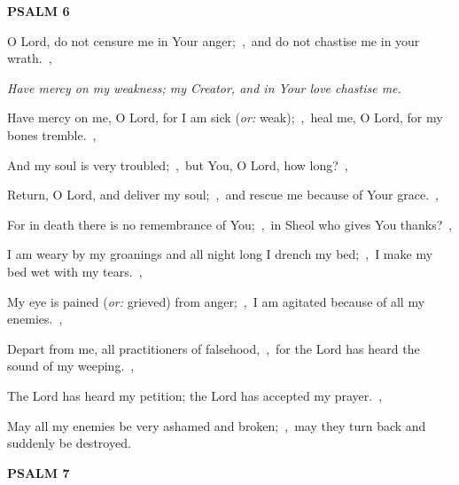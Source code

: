 \documentclass[12pt,twoside,a5paper]{article}
\newcommand{\psalm}[1]{\textbf{PSALM {#1}}\nopagebreak}
\newcommand{\qanona}[1]{{\liturgicalhint{Qanona.} \emph{#1}}}
\newcommand{\translationoption}[1]{\emph{or:} #1}
\begin{document}
\psalm{6}

\begin{normalparskip}
  O Lord, do not censure me in Your anger;~\sep\ and do not chastise me in your wrath.~\sep

  \qanona{Have mercy on my weakness; my Creator, and in Your love chastise me.}

  Have mercy on me, O Lord, for I am sick (\translationoption{weak});~\sep\ heal me, O Lord, for my bones tremble.~\sep

  And my soul is very troubled;~\sep\ but You, O Lord, how long?~\sep

  Return, O Lord, and deliver my soul;~\sep\ and rescue me because of Your grace.~\sep

  For in death there is no remembrance of You;~\sep\ in Sheol who gives You thanks?~\sep

  I am weary by my groanings and all night long I drench my bed;~\sep\ I make my bed wet with my tears.~\sep

  My eye is pained (\translationoption{grieved}) from anger;~\sep\ I am agitated because of all my enemies.~\sep

  Depart from me, all practitioners of falsehood,~\sep\ for the Lord has heard the sound of my weeping.~\sep

  The Lord has heard my petition; the Lord has accepted my prayer.~\sep

  May all my enemies be very ashamed and broken;~\sep\ may they turn back and suddenly be destroyed.
\end{normalparskip}

\psalm{7}
\end{document}
